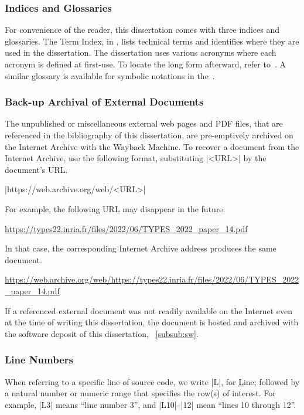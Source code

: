 \subsubsection{Indices and Glossaries}

For convenience of the reader, this dissertation comes with three indices and glossaries.
The Term Index, in , lists technical terms and identifies where they are used in the dissertation.
The dissertation uses various acronyms where each acronym is defined at first-use.
To locate the long form afterward, refer to~\aref{\acronymtype}.
A similar glossary is available for symbolic notations in the~.

\subsubsection{Back-up Archival of External Documents}

The unpublished or miscellaneous external web pages and PDF files, that are referenced in the bibliography of this dissertation,
are pre-emptively archived on the Internet Archive with the Wayback Machine.
To recover a document from the Internet Archive, use the following format, substituting \pr|<URL>| by the document's URL\@.
\begin{center}
    \pr|https://web.archive.org/web/<URL>|
\end{center}
For example, the following URL may disappear in the future.
\begin{center}
    \url{https://types22.inria.fr/files/2022/06/TYPES_2022_paper_14.pdf}
\end{center}
In that case, the corresponding Internet Archive address produces the same document.
\begin{center}
    \url{https://web.archive.org/web/https://types22.inria.fr/files/2022/06/TYPES_2022_paper_14.pdf}
\end{center}

If a referenced external document was not readily available on the Internet even at the time of writing this dissertation,
the document is hosted and archived with the software deposit of this dissertation, \cf~\autoref{subsub:sw}.

\subsubsection{Line Numbers}
When referring to a specific line of source code,
we write \pr|L|, for \underline{L}ine;
followed by a natural number or numeric range that specifies the row(s) of interest.
For example, \pr|L3| means \enquote{line number 3}, and \pr|L10|--\pr|12| mean \enquote{lines 10 through 12}.
